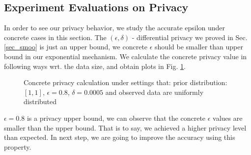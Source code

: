 \documentclass[sigconf]{acmart}
\begin{document}
\subsection{Experiment Evaluations on Privacy}
\label{subsec_experiment_privacy}
In order to see our privacy behavior, we study the accurate epsilon under concrete cases in this section. The $(\epsilon, \delta)$ - differential privacy we proved in Sec. \ref{sec_smoo} is just an upper bound, we concrete $\epsilon$ should be smaller than upper bound in our exponential mechanism. We calculate the concrete privacy value in following ways wrt. the data size, and obtain plots in Fig. \ref{fig_privacy}.

\begin{figure}
\begin{center}
\centering
\caption{Concrete privacy calculation under settings that: prior distribution:$[1,1]$, $\epsilon = 0.8$, $\delta = 0.0005$ and observed data are uniformly distributed}
\label{fig_privacy}
\end{center}
\end{figure}

$\epsilon = 0.8$ is a privacy upper bound, we can observe that the concrete $\epsilon$ values are smaller than the upper bound. That is to say, we achieved a higher privacy level than expected. In next step, we are going to improve the accuracy using this property.




\end{document}
